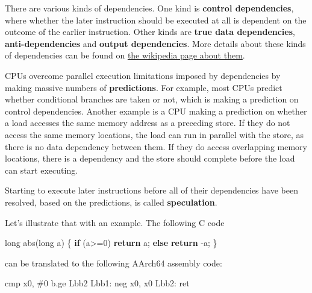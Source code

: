 \documentclass[a4paper,]{report}
\newenvironment{Shaded}{}{}
\newcommand{\BuiltInTok}[1]{#1}
\newcommand{\ControlFlowTok}[1]{\textcolor[rgb]{0.00,0.44,0.13}{\textbf{#1}}}
\newcommand{\DataTypeTok}[1]{\textcolor[rgb]{0.56,0.13,0.00}{#1}}
\newcommand{\DecValTok}[1]{\textcolor[rgb]{0.25,0.63,0.44}{#1}}
\newcommand{\FunctionTok}[1]{\textcolor[rgb]{0.02,0.16,0.49}{#1}}
\newcommand{\NormalTok}[1]{#1}
\begin{document}
There are various kinds of dependencies. One kind is \textbf{control
dependencies}, where whether the later
instruction should be executed at all is dependent on the outcome of the
earlier instruction. Other kinds are \textbf{true data
dependencies}, \textbf{anti-dependencies} and
\textbf{output dependencies}. More details
about these kinds of dependencies can be found on
\href{https://en.wikipedia.org/wiki/Data_dependency}{the wikipedia page
about them}.

CPUs overcome parallel execution limitations imposed by dependencies by
making massive numbers of \textbf{predictions}. For
example, most CPUs predict whether conditional branches are taken or
not, which is making a prediction on control dependencies. Another
example is a CPU making a prediction on whether a load accesses the same
memory address as a preceding store. If they do not access the same
memory locations, the load can run in parallel with the store, as there
is no data dependency between them. If they do access overlapping memory
locations, there is a dependency and the store should complete before
the load can start executing.

Starting to execute later instructions before all of their dependencies
have been resolved, based on the predictions, is called
\textbf{speculation}.

Let's illustrate that with an example. The following C code

\begin{Shaded}
\begin{Highlighting}[]
\DataTypeTok{long}\NormalTok{ abs(}\DataTypeTok{long}\NormalTok{ a) \{}
  \ControlFlowTok{if}\NormalTok{ (a>=}\DecValTok{0}\NormalTok{)}
    \ControlFlowTok{return}\NormalTok{ a;}
  \ControlFlowTok{else}
    \ControlFlowTok{return}\NormalTok{ -a;}
\NormalTok{  \}}
\end{Highlighting}
\end{Shaded}

can be translated to the following AArch64 assembly code:

\begin{Shaded}
\begin{Highlighting}[]
        \BuiltInTok{cmp}\NormalTok{     x0, #}\DecValTok{0}
\NormalTok{        b.ge    Lbb2}
\FunctionTok{Lbb1:}
        \BuiltInTok{neg}\NormalTok{     x0, x0}
\FunctionTok{Lbb2:}
        \BuiltInTok{ret}
\end{Highlighting}
\end{Shaded}
\end{document}
